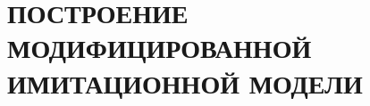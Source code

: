 \section[Построение модифицированной имитационной модели]{ПОСТРОЕНИЕ МОДИФИЦИРОВАННОЙ \\
ИМИТАЦИОННОЙ МОДЕЛИ}




\pagebreak
